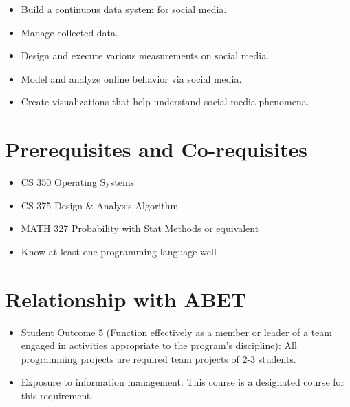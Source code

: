 \documentclass[11pt,article,oneside]{memoir} %
\begin{document}
\begin{itemize}
    \item Build a continuous data system for social media.
    \item Manage collected data.
    \item Design and execute various measurements on social media.
    \item Model and analyze online behavior via social media.
    \item Create visualizations that help understand social media phenomena.
\end{itemize}



\section{Prerequisites and Co-requisites}%
\label{sec:Prerequisites}

\begin{itemize}
    \item CS 350 Operating Systems
    \item CS 375 Design \& Analysis Algorithm
    \item MATH 327 Probability with Stat Methods or equivalent
    \item Know at least one programming language well
\end{itemize}


\section{Relationship with ABET}%

\begin{itemize}
    \item Student Outcome 5 (Function effectively as a member or leader of a team engaged in
    activities appropriate to the program's discipline): All programming projects are required
    team projects of 2-3 students.
    \item Exposure to information management: This course is a designated course for this
    requirement.
\end{itemize}

\end{document}
